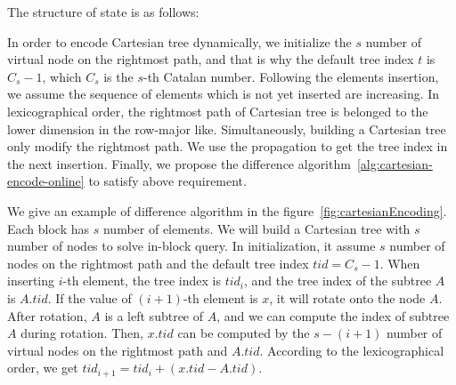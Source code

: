 The structure of state is as follows:

\iffalse
我們定義轉移狀態由 5 個變數來決定動態笛卡爾樹的編碼，當前插入第 $i$ 個
元素，最終填充 $s$ 個元素，當前的樹編號 $\mathit{tid}$，以及笛卡爾樹的
右鏈狀態指針 $Dp$ 與其堆疊 $D$，其結構如下：
\fi


\begin{minipage}{0.9\linewidth}



\end{minipage}


In order to encode Cartesian tree dynamically, we initialize the $s$
number of virtual node on the rightmost path, and that is why the
default tree index ${\mathit t}$ is $C_s - 1$, which $C_s$ is the $s$-th
Catalan number.  Following the elements insertion, we assume the
sequence of elements which is not yet inserted are increasing.  In
lexicographical order, the rightmost path of Cartesian tree is belonged
to the lower dimension in the row-major like.  Simultaneously, building
a Cartesian tree only modify the rightmost path.  We use the propagation
to get the tree index in the next insertion.  Finally, we propose the
difference algorithm~\ref{alg:cartesian-encode-online} to satisfy above
requirement.

\iffalse 為了解決在線詢問操作，取 $s = \frac{\log n}{4}$。根據字典順序
的編碼性質，一開始建立虛設點 $s$ 個在右鏈上，其樹編號 $\mathit{tid} =
C_s - 1$ 。隨著插入元素的增加，尚未加入的元素都預設嚴格遞減，加上根據
編碼順序，我們藉由差值來維護在線編碼 (如圖
~\ref{fig:cartesianEncoding})。根據上述的編碼想法，我們得到算法
~\ref{alg:cartesian-encode-online}。\fi

We give an example of difference algorithm in the
figure~\ref{fig:cartesianEncoding}.  Each block has $s$ number of
elements.  We will build a Cartesian tree with $s$ number of nodes to
solve in-block query.  In initialization, it assume $s$ number of nodes
on the rightmost path and the default tree index $\mathit{tid} = C_s -
1$.  When inserting $i$-th element, the tree index is $\mathit{tid}_i$,
and the tree index of the subtree $A$ is $A.\mathit{tid}$.  If the value
of $(i+1)$-th element is $x$, it will rotate onto the node $A$.  After
rotation, $A$ is a left subtree of $A$, and we can compute the index of
subtree $A$ during rotation.  Then, $x.\mathit{tid}$ can be computed by
the $s-(i+1)$ number of virtual nodes on the rightmost path and
$A.\mathit{tid}$.  According to the lexicographical order, we get
$\mathit{tid}_{i+1} = \mathit{tid}_i + (x.\mathit{tid} -
A.\mathit{tid})$.

